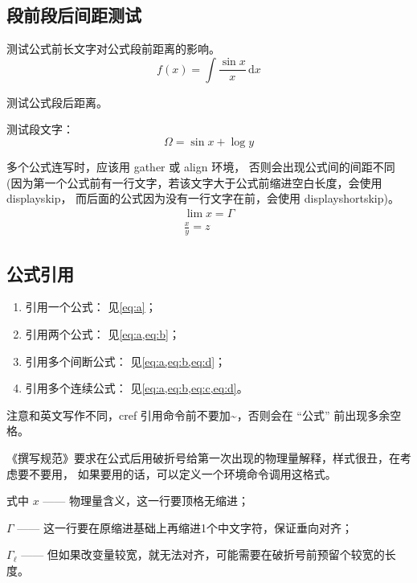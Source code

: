 \subsection{段前段后间距测试}

测试公式前长文字对公式段前距离的影响。
%
\begin{equation}  \label{eq:a}
	f(x) = \int\frac{\sin x}{x}\,\mathrm{d}x
\end{equation}

测试公式段后距离。

测试段文字：
%
\begin{equation}	\label{eq:b}
	\Omega = \sin x + \log y
\end{equation}

多个公式连写时，应该用 gather 或 align 环境， 否则会出现公式间的间距不同
(因为第一个公式前有一行文字，若该文字大于公式前缩进空白长度，会使用 displayskip，
而后面的公式因为没有一行文字在前，会使用 displayshortskip)。
%
\begin{gather}
	\lim x = \Gamma	\label{eq:c} \\
	\frac{x}{y} = z	\label{eq:d}
\end{gather}

\subsection{公式引用}

\begin{enumerate}
	\item 引用一个公式： 见\cref{eq:a}；
	\item 引用两个公式： 见\cref{eq:a,eq:b}；
	\item 引用多个间断公式： 见\cref{eq:a,eq:b,eq:d}；
	\item 引用多个连续公式： 见\cref{eq:a,eq:b,eq:c,eq:d}。
\end{enumerate}

注意和英文写作不同，cref 引用命令前不要加\~{}，否则会在 ``公式'' 前出现多余空格。

《撰写规范》要求在公式后用破折号给第一次出现的物理量解释，样式很丑，在考虑要不要用，
如果要用的话，可以定义一个环境命令调用这格式。

\noindent 式中\hspace{\ccwd} $x$ —— 物理量含义，这一行要顶格无缩进；

\hspace{\ccwd} $\Gamma$ —— 这一行要在原缩进基础上再缩进1个中文字符，保证垂向对齐；

\hspace{\ccwd} $\Gamma_\ell$ ——
但如果改变量较宽，就无法对齐，可能需要在破折号前预留个较宽的长度。

